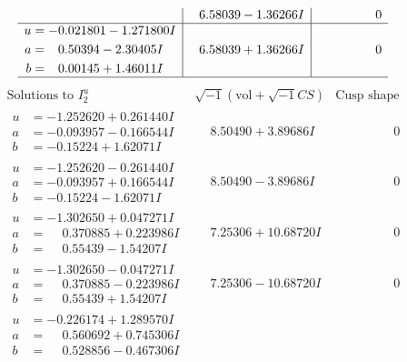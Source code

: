 \documentclass[1p]{elsarticle_modified}
\theoremstyle{definition}
\newcommand{\I}{\sqrt{-1}}
\begin{document}
$$\begin{array}{c|c|c}
 & \phantom{-}6.58039 - 1.36266 I & \phantom{-0.000000 } 0 \\ \hline\begin{aligned}
u &= -0.021801 - 1.271800 I \\
a &= \phantom{-}0.50394 - 2.30405 I \\
b &= \phantom{-}0.00145 + 1.46011 I\end{aligned}
 & \phantom{-}6.58039 + 1.36266 I & \phantom{-0.000000 } 0\\
 \hline 
 \end{array}$$\newpage$$\begin{array}{c|c|c}  
\text{Solutions to }I^u_{2}& \I (\text{vol} + \sqrt{-1}CS) & \text{Cusp shape}\\
 \hline 
\begin{aligned}
u &= -1.252620 + 0.261440 I \\
a &= -0.093957 - 0.166544 I \\
b &= -0.15224 + 1.62071 I\end{aligned}
 & \phantom{-}8.50490 + 3.89686 I & \phantom{-0.000000 } 0 \\ \hline\begin{aligned}
u &= -1.252620 - 0.261440 I \\
a &= -0.093957 + 0.166544 I \\
b &= -0.15224 - 1.62071 I\end{aligned}
 & \phantom{-}8.50490 - 3.89686 I & \phantom{-0.000000 } 0 \\ \hline\begin{aligned}
u &= -1.302650 + 0.047271 I \\
a &= \phantom{-}0.370885 + 0.223986 I \\
b &= \phantom{-}0.55439 - 1.54207 I\end{aligned}
 & \phantom{-}7.25306 + 10.68720 I & \phantom{-0.000000 } 0 \\ \hline\begin{aligned}
u &= -1.302650 - 0.047271 I \\
a &= \phantom{-}0.370885 - 0.223986 I \\
b &= \phantom{-}0.55439 + 1.54207 I\end{aligned}
 & \phantom{-}7.25306 - 10.68720 I & \phantom{-0.000000 } 0 \\ \hline\begin{aligned}
u &= -0.226174 + 1.289570 I \\
a &= \phantom{-}0.560692 + 0.745306 I \\
b &= \phantom{-}0.528856 - 0.467306 I\end{aligned}

\end{array}$$
\end{document}

